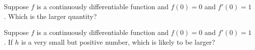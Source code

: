\documentclass{ximera}
\newcommand{\recommendation}[1]{}
\newcommand{\GoodQuestions}[1]{}
\begin{document}


\begin{problem}
\recommendation{Vic}
  Suppose $f$ is a continuously differentiable function and $f(0) = 0$ and $f'(0) = 1$.  Which is the larger quantity?
  \begin{multipleChoice}
  \end{multipleChoice}
\end{problem}

\begin{problem}
  Suppose $f$ is a continuously differentiable function and $f(0) = 0$ and $f'(0) = 1$. If $h$ is a very small but positive number, which is likely to be larger?
  \begin{multipleChoice}
  \end{multipleChoice}
\end{problem}


  
\end{document}
